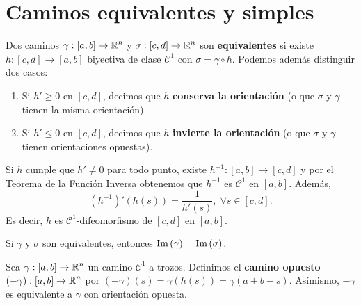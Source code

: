  \section{Caminos equivalentes y simples}
\begin{definition}
	Dos caminos $\displaystyle \gamma : \left[a,b\right] \to \mathbb{R}^{n} $ y $\displaystyle \sigma : \left[c,d\right] \to \mathbb{R}^{n} $ son \textbf{equivalentes} si existe $\displaystyle h : \left[c,d\right] \to \left[a,b\right]  $ biyectiva de clase $\displaystyle \mathcal{C}^{1} $ con $\displaystyle \sigma = \gamma \circ h $. Podemos además distinguir dos casos:
	\begin{enumerate}
		\item Si $\displaystyle h'\geq0 $ en $\displaystyle \left[c,d\right]  $, decimos que $\displaystyle h $ \textbf{conserva la orientación} (o que $\displaystyle \sigma  $ y $\displaystyle \gamma  $ tienen la misma orientación).
		\item Si $\displaystyle h'\leq0 $ en $\displaystyle \left[c,d\right]  $, decimos que $\displaystyle h $ \textbf{invierte la orientación} (o que $\displaystyle \sigma  $ y $\displaystyle \gamma  $ tienen orientaciones opuestas).
	\end{enumerate}
\end{definition}
\begin{observation}
	Si $\displaystyle h $ cumple que $\displaystyle h'\neq 0 $ para todo punto, existe $\displaystyle h^{-1} : \left[a,b\right] \to \left[c,d\right]  $ y por el Teorema de la Función Inversa obtenemos que $\displaystyle h^{-1} $ es $\displaystyle \mathcal{C}^{1} $ en $\displaystyle \left[a,b\right]  $. Además, 
	\[\left(h^{-1}\right)'\left(h\left(s\right)\right)=\frac{1}{h'\left(s\right)}, \; \forall s \in \left[c,d\right]  .\]
	Es decir, $\displaystyle h $ es $\displaystyle \mathcal{C}^{1} $-difeomorfismo de $\displaystyle \left[c,d\right]  $ en $\displaystyle \left[a,b\right]  $. 
\end{observation}
\begin{observation}
Si $\displaystyle \gamma  $ y $\displaystyle \sigma  $ son equivalentes, entonces $\displaystyle \operatorname{Im}\left(\gamma \right) = \operatorname{Im}\left(\sigma \right) $. 
\end{observation}
\begin{definition}
	Sea $\displaystyle \gamma : \left[a,b\right] \to \mathbb{R}^{n} $ un camino $\displaystyle \mathcal{C}^{1} $ a trozos. Definimos el \textbf{camino opuesto} $\displaystyle \left(-\gamma \right):\left[a,b\right] \to \mathbb{R}^{n} $ por $\displaystyle \left(-\gamma \right)\left(s\right)=\gamma\left(h\left(s\right)\right)=\gamma\left(a+b-s\right) $. Asímismo, $\displaystyle -\gamma  $ es equivalente a $\displaystyle \gamma  $ con orientación opuesta.
\end{definition}

